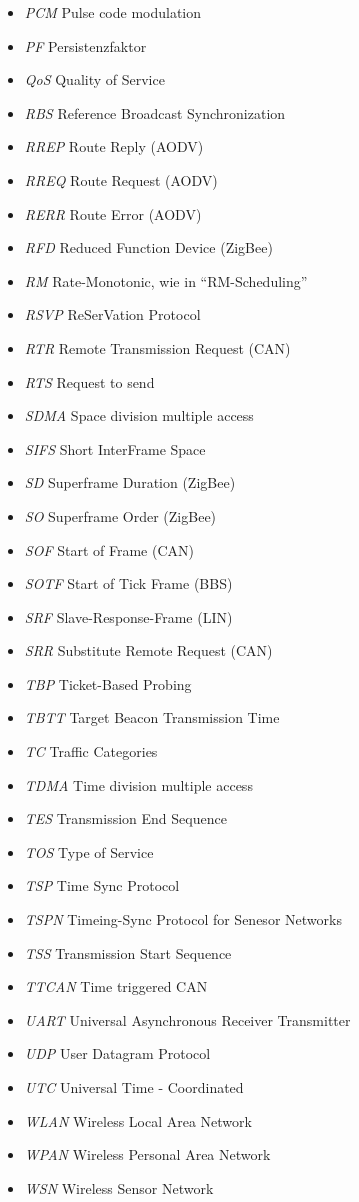 \documentclass{article}
\begin{document}
\begin{itemize}
	\item \emph{PCM} Pulse code modulation
	\item \emph{PF} Persistenzfaktor
	\item \emph{QoS} Quality of Service
	\item \emph{RBS} Reference Broadcast Synchronization
	\item \emph{RREP} Route Reply (AODV)
	\item \emph{RREQ} Route Request (AODV)
	\item \emph{RERR} Route Error (AODV)
	\item \emph{RFD} Reduced Function Device (ZigBee)
	\item \emph{RM} Rate-Monotonic, wie in "`RM-Scheduling"'
	\item \emph{RSVP} ReSerVation Protocol
	\item \emph{RTR} Remote Transmission Request (CAN)
	\item \emph{RTS} Request to send
	\item \emph{SDMA} Space division multiple access
	\item \emph{SIFS} Short InterFrame Space
	\item \emph{SD} Superframe Duration (ZigBee)
	\item \emph{SO} Superframe Order (ZigBee)
	\item \emph{SOF} Start of Frame (CAN)
	\item \emph{SOTF} Start of Tick Frame (BBS)
	\item \emph{SRF} Slave-Response-Frame (LIN)
	\item \emph{SRR} Substitute Remote Request (CAN)
	\item \emph{TBP} Ticket-Based Probing
	\item \emph{TBTT} Target Beacon Transmission Time
	\item \emph{TC} Traffic Categories
	\item \emph{TDMA} Time division multiple access
	\item \emph{TES} Transmission End Sequence
	\item \emph{TOS} Type of Service
	\item \emph{TSP} Time Sync Protocol
	\item \emph{TSPN} Timeing-Sync Protocol for Senesor Networks
	\item \emph{TSS} Transmission Start Sequence
	\item \emph{TTCAN} Time triggered CAN
	\item \emph{UART} Universal Asynchronous Receiver Transmitter
	\item \emph{UDP} User Datagram Protocol
	\item \emph{UTC} Universal Time - Coordinated
	\item \emph{WLAN} Wireless Local Area Network
	\item \emph{WPAN} Wireless Personal Area Network
	\item \emph{WSN} Wireless Sensor Network
\end{itemize}
\end{document}
